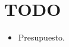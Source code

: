 %
%
%
%

\cleardoublepage
\chapter{TODO}
\label{chap:TODO}

\begin{itemize}
	\item Presupuesto.
\end{itemize}